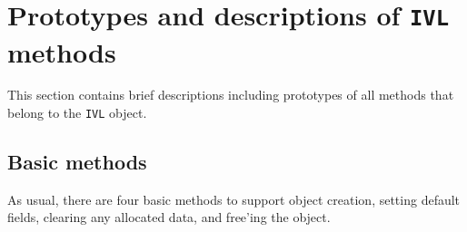 \par
\section{Prototypes and descriptions of {\tt IVL} methods}
\label{section:IVL:proto}
\par
This section contains brief descriptions including prototypes
of all methods that belong to the {\tt IVL} object.
\par
\subsection{Basic methods}
\label{subsection:IVL:proto:basics}
\par
As usual, there are four basic methods to support object creation,
setting default fields, clearing any allocated data, and free'ing
the object.
\par
